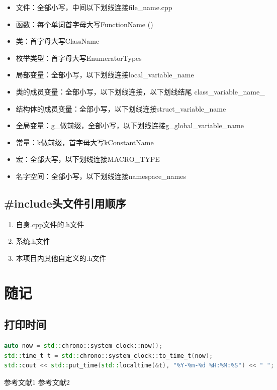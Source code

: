 \documentclass[11pt,a4paper]{article}
\begin{document}
\begin{itemize}
    \item 文件：全部小写，中间以下划线连接file_name.cpp
    \item 函数：每个单词首字母大写FunctionName ()
    \item 类：首字母大写ClassName
    \item 枚举类型：首字母大写EnumeratorTypes
    \item 局部变量：全部小写，以下划线连接local_variable_name
    \item 类的成员变量：全部小写，以下划线连接，以下划线结尾 class_variable_name_
    \item 结构体的成员变量：全部小写，以下划线连接struct_variable_name
    \item 全局变量：g_做前缀，全部小写，以下划线连接g_global_variable_name
    \item 常量：k做前缀，首字母大写kConstantName
    \item 宏：全部大写，以下划线连接MACRO_TYPE
    \item 名字空间：全部小写，以下划线连接namespace_names
\end{itemize}

\subsection{#include头文件引用顺序}

\begin{enumerate}
    \item 自身.cpp文件的.h文件
    \item 系统.h文件
    \item 本项目内其他自定义的.h文件
\end{enumerate}

\section{随记}

\subsection{打印时间}

\begin{lstlisting}[language={C++}]
auto now = std::chrono::system_clock::now();
std::time_t t = std::chrono::system_clock::to_time_t(now);
std::cout << std::put_time(std::localtime(&t), "%Y-%m-%d %H:%M:%S") << " ";
\end{lstlisting}

\begin{thebibliography}{99}
 参考文献1
 参考文献2
\end{thebibliography}
\end{document}
